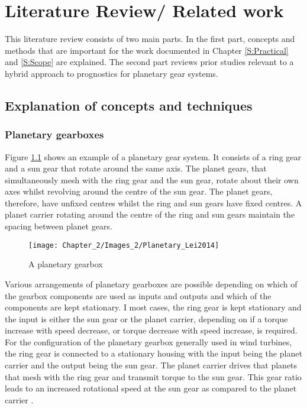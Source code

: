 
\chapter{Literature Review/ Related work}
This literature review consists of two main parts. In the first part, concepts and methods that are important for the work documented in Chapter \ref{S:Practical} and \ref{S:Scope} are explained. The second part reviews prior studies relevant to a hybrid approach to prognostics for planetary gear systems.

\section{Explanation of concepts and techniques}

\subsection{Planetary gearboxes} \label{S:Literature}

Figure \ref{F:Planetary_Lei2014} shows an example of a planetary gear system. It consists of a ring gear and a sun gear that rotate around the same axis. The planet gears, that simultaneously mesh with the ring gear and the sun gear, rotate about their own axes whilst revolving around the centre of the sun gear. The planet gears, therefore, have unfixed centres whilst the ring and sun gears have fixed centres. A planet carrier rotating around the centre of the ring and sun gears maintain the spacing between planet gears. 
\begin{figure}[H]
	\centering
	\texttt{[image: Chapter\_2/Images\_2/Planetary\_Lei2014]}
	\caption{A planetary gearbox \citep{Lei2014}}
	\label{F:Planetary_Lei2014}
\end{figure}




Various arrangements of planetary gearboxes are possible depending on which of the gearbox components are used as inputs and outputs and which of the components are kept stationary. I most cases, the ring gear is kept stationary and the input is either the sun gear or the planet carrier, depending on if a torque increase with speed decrease, or torque decrease with speed increase, is required. For the configuration of the planetary gearbox generally used in wind turbines, the ring gear is connected to a stationary housing with the input being the planet carrier and the output being the sun gear. The planet carrier drives that planets that mesh with the ring gear and transmit torque to the sun gear. This gear ratio leads to an increased rotational speed at the sun gear as compared to the planet carrier \cite{Zimroz2014}. 

